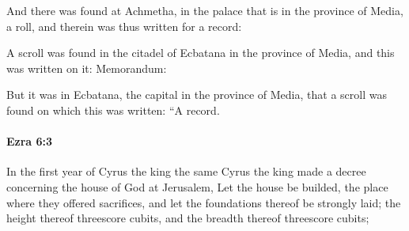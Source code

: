 			\begin{versebox}
					\item[BHS] 
					\item[LXX] 
					\item[ASV] And there was found at Achmetha, in the palace that is in the province of Media, a roll, and therein was thus written for a record:
					\item[NIV] A scroll was found in the citadel of Ecbatana in the province of Media, and this was written on it: Memorandum:
					\item[NRSV] But it was in Ecbatana, the capital in the province of Media, that a scroll was found on which this was written: “A record.
			\end{versebox}

		\paragraph{Ezra 6:3} %
			\label{EZRA-6-3}

			In the first year of Cyrus the king the same Cyrus the king made a decree concerning the house of God at Jerusalem, Let the house be builded, the place where they offered sacrifices, and let the foundations thereof be strongly laid; the height thereof threescore cubits, and the breadth thereof threescore cubits;

